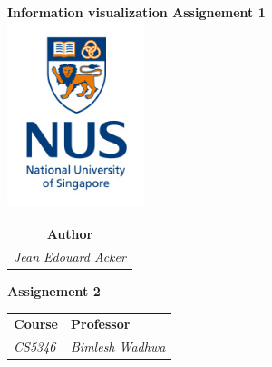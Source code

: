 \documentclass[a4paper,12pt,titlepage,leqno]{article}
\begin{document}
\begin{titlepage}

    \begin{center}
        \Huge{\textbf{Information visualization Assignement 1}} \\
        \vspace{1cm}
        \includegraphics[width=0.30\textwidth]{ressources/logo_nus.jpg} 
    \end{center}
    
    \vspace{1cm}

    \begin{center}
      \begin{tabular}{c}
          \textbf{Author} \\
          \textit{Jean Edouard Acker}
      \end{tabular}
  \end{center}
    
    \vspace{1cm}
    
    \begin{center}
        \textbf{\LARGE{Assignement 2}} 
    \end{center}

    \begin{center} 
      \vspace{1cm}
      \begin{tabular}{>{\centering\arraybackslash}m{} >{\centering\arraybackslash}m{}}
          \textbf{Course} & \textbf{Professor} \\
          \textit{CS5346} & \textit{Bimlesh Wadhwa}
      \end{tabular}
  \end{center} 
     
\end{titlepage}



\setcounter{page}{2}
\end{document}
